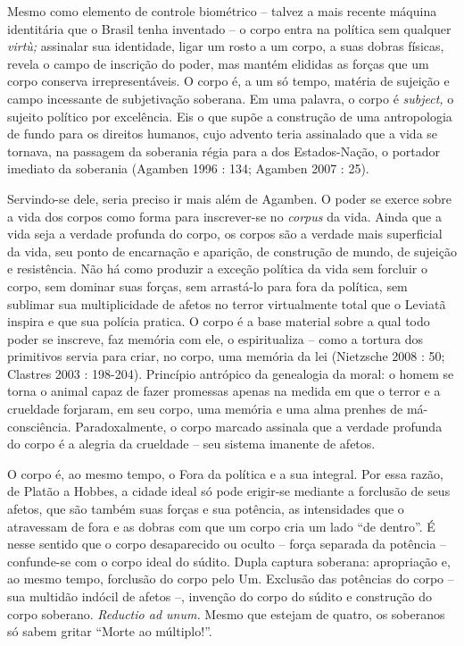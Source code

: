 Mesmo como elemento de controle biométrico -- talvez a mais recente
máquina identitária que o Brasil tenha inventado -- o corpo entra na
política sem qualquer \emph{virtù; }assinalar sua identidade, ligar um
rosto a um corpo, a suas dobras físicas, revela o campo de inscrição do
poder, mas mantém elididas as forças que um corpo conserva
irrepresentáveis. O corpo é, a um só tempo, matéria de sujeição e campo
incessante de subjetivação soberana. Em uma palavra, o corpo é
\emph{subject,} o sujeito político por excelência. Eis o que supõe a
construção de uma antropologia de fundo para os direitos humanos, cujo
advento teria assinalado que a vida se tornava, na passagem da soberania
régia para a dos Estados-Nação, o portador imediato da soberania
(Agamben 1996 : 134; Agamben\emph{ }2007 : 25).

Servindo-se dele, seria preciso ir mais além de Agamben. O poder se
exerce sobre a vida dos corpos como forma para inscrever-se no
\emph{corpus }da vida. Ainda que a vida seja a verdade profunda do
corpo, os corpos são a verdade mais superficial da vida, seu ponto de
encarnação e aparição, de construção de mundo, de sujeição e
resistência. Não há como produzir a exceção política da vida sem
forcluir o corpo, sem dominar suas forças, sem arrastá-lo para fora da
política, sem sublimar sua multiplicidade de afetos no terror
virtualmente total que o Leviatã inspira e que sua polícia pratica. O
corpo é a base material sobre a qual todo poder se inscreve, faz memória
com ele, o espiritualiza -- como a tortura dos primitivos servia para
criar, no corpo, uma memória da lei (Nietzsche 2008 : 50; Clastres 2003
: 198-204). Princípio antrópico da genealogia da moral: o homem se torna
o animal capaz de fazer promessas apenas na medida em que o terror e a
crueldade forjaram, em seu corpo, uma memória e uma alma prenhes de
má-consciência. Paradoxalmente, o corpo marcado assinala que a verdade
profunda do corpo é a alegria da crueldade -- seu sistema imanente de
afetos.

O corpo é, ao mesmo tempo, o Fora da política e a sua integral. Por essa
razão, de Platão a Hobbes, a cidade ideal só pode erigir-se mediante a
forclusão de seus afetos, que são também suas forças e sua potência, as
intensidades que o atravessam de fora e as dobras com que um corpo cria
um lado ``de dentro''. É nesse sentido que o corpo desaparecido ou
oculto -- força separada da potência -- confunde-se com o corpo ideal do
súdito. Dupla captura soberana: apropriação e, ao mesmo tempo, forclusão
do corpo pelo Um. Exclusão das potências do corpo -- sua multidão
indócil de afetos --, invenção do corpo do súdito e construção do corpo
soberano. \emph{Reductio ad unum. }Mesmo que estejam de quatro, os
soberanos só sabem gritar ``Morte ao múltiplo!''.

